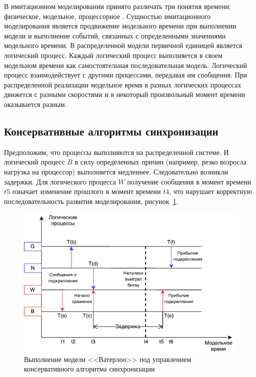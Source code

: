 В имитационном моделировании принято различать три понятия времени: физическое, модельное, процессорное \cite{okol}. Сущностью имитационного моделирования является продвижение модельного времени при выполнении модели и выполнение событий, связанных с определенными значениями модельного времени. В распределенной модели первичной единицей является логический процесс. Каждый логический процесс выполняется в своем модельном времени как самостоятельная последовательная модель. Логический процесс взаимодействует с другими процессами, передавая им сообщения. При распределенной реализации модельное время в разных логических процессах движется с разными скоростями и в некоторый произвольный момент времени оказывается разным.



\subsection{Консервативные алгоритмы синхронизации} \label{subsect1}

Предположим, что процессы выполняются на распределенной системе. И логический процесс $B$ в силу определенных причин (например, резко возросла нагрузка на процессор) выполняется медленнее. Следовательно возникли задержки. Для логического процесса $W$ получение сообщения в момент времени $t5$ означает изменение прошлого в момент времени $t4$, что нарушает корректную последовательность развития моделирования, рисунок~\ref{fig:Выполнение модели <<Ватерлоо>> под управлением консервативного алгоритма синхронизации}.

\begin{figure}[!ht]
\centering
\includegraphics[scale=1]{images/waterloo-kas.pdf}
\caption{Выполнение модели <<Ватерлоо>> под управлением консервативного алгоритма синхронизации}
\label{fig:Выполнение модели <<Ватерлоо>> под управлением консервативного алгоритма синхронизации}
\end{figure}

